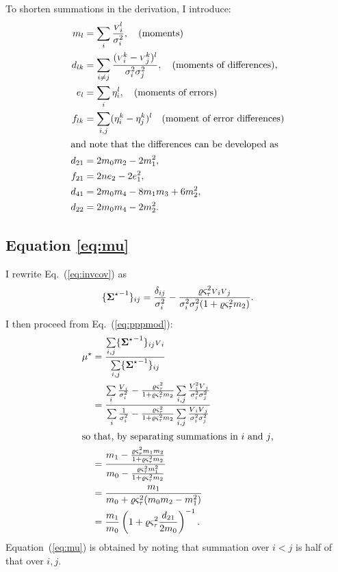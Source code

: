 \documentclass{pasa}
\begin{document}
To shorten summations in the derivation, I introduce:
\begin{align*}
    m_l    &= \sum_i \frac{{\scriptstyle V}_i^l}{\sigma_i^2}, \quad\text{(moments)}\\
    d_{lk} &= \sum_{i \ne j} \frac{({\scriptstyle V}_i^k-{\scriptstyle V}_j^k)^l}{\sigma_i^2\sigma_j^2}, \quad\text{(moments of differences)},\\
    e_l    &= \sum_i \eta_i^l, \quad\text{(moments of errors)}\\
    f_{lk} &= \sum_{i, j} (\eta_i^k - \eta_j^k)^l \quad\text{(moment of error differences)}\\
\intertext{and note that the differences can be developed as}
    d_{21} &= 2m_0m_2 - 2m_1^2,\\
    f_{21} &= 2n e_2 -  2e_1^2,\\
    d_{41} &= 2m_0m_4 - 8m_1m_3 + 6m_2^2,\\
    d_{22} &= 2m_0m_4 - 2m_2^2.
\end{align*}


\subsection{Equation \ref{eq:mu}}
\label{ap:mu}

I rewrite Eq.~(\ref{eq:invcov}) as 
\begin{equation*}
    \{ {\boldsymbol{\Sigma}^\star}^{-1} \}_{ij} = \frac{\delta_{ij}}{\sigma_i^2}
         - \frac{\varrho\varsigma_\tau^2{\scriptstyle V}_i{\scriptstyle V}_j}
                {\sigma_i^2\sigma_j^2(1 + \varrho\varsigma_\tau^2 m_2)}.
\end{equation*}
I then proceed from Eq.~(\ref{eq:pppmod}):
\begin{align*}
    \mu^\star &= \frac{\sum\limits_{i,j} \{ {\boldsymbol{\Sigma}^\star}^{-1} \}_{ij} {\scriptstyle V}_i} 
                       {\sum\limits_{i,j} \{ {\boldsymbol{\Sigma}^\star}^{-1} \}_{ij} }\\
               &= \frac{\sum\limits_i \frac{{\scriptstyle V}_i}{\sigma_i^2}
                     -  \frac{\varrho\varsigma_\tau^2}{1+ \varrho\varsigma_\tau^2m_2} 
                \sum\limits_{i,j} \frac{{\scriptstyle V}_i^2{\scriptstyle V}_j}{\sigma_i^2\sigma_j^2}}
                  {\sum\limits_i \frac 1{\sigma_i^2}
                     -  \frac{\varrho\varsigma_\tau^2}{1+ \varrho\varsigma_\tau^2m_2} 
                \sum\limits_{i,j} \frac{{\scriptstyle V}_i{\scriptstyle V}_j}{\sigma_i^2\sigma_j^2}}\\
\intertext{so that, by separating summations in $i$ and $j$,}
               &= \frac
                   {m_1-\frac{\varrho\varsigma_\tau^2m_1m_2}{1 + \varrho\varsigma_\tau^2 m_2}}
                   {m_0-\frac{\varrho\varsigma_\tau^2 m_1^2}{1 + \varrho\varsigma_\tau^2 m_2}}\\
               &= \frac{m_1}{m_0 + \varrho\varsigma_\tau^2(m_0m_2 - m_1^2)}\\
               &= \frac{m_1}{m_0} \left( 1 + \varrho\varsigma_\tau^2\frac{d_{21}}{2m_0} \right)^{-1}.
\end{align*}
Equation~(\ref{eq:mu}) is obtained by noting that summation over $i < j$ is
half of that over $i, j$.
\end{document}
